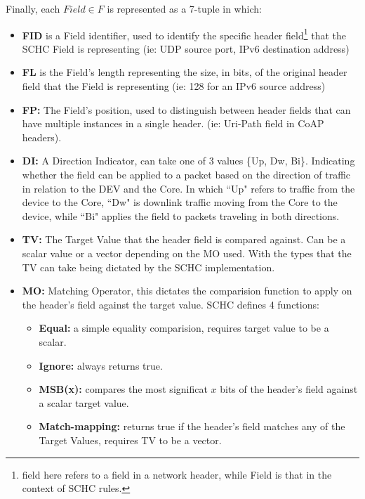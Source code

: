 \documentclass[cspaper]{IEEEtran}
\numberwithin{equation}{subsection}
\begin{document}
	Finally, each $Field \in F$ is represented as a 7-tuple in which:
	\begin{itemize}
		\item \textbf{FID} is a Field identifier, used to identify the specific header field\footnote{field here refers to a field in 
			a network header, while Field is that in the context of SCHC rules.} that the SCHC Field is representing (ie: UDP source port, IPv6 destination address)


		\item \textbf{FL}
			is the Field's length representing the size, in bits, of the original header field that the Field is representing (ie: 128 for an IPv6 source address)
		\item \textbf{FP:} 
			The Field's position, used to distinguish between header fields that can have multiple instances in a single header. (ie: Uri-Path field in CoAP headers). 

		\item \textbf{DI:} 
			 A Direction Indicator, can take one of 3 values \{Up, Dw, Bi\}. Indicating whether the field can be applied to a packet based on the direction of traffic
			in relation to the DEV and the Core. In which ``Up" refers to traffic from the device to the Core, ``Dw" is downlink traffic moving from
			the Core to the device, while ``Bi" applies the field to packets traveling in both directions.

	\item \textbf{TV:}
			The Target Value that the header field is compared against. Can be a scalar value or a vector depending on the MO used. With the types that the 
			TV can take being dictated by the SCHC implementation.

	\item \textbf{MO:}
			Matching Operator, this dictates the comparision function to apply on the header's field against the target value. SCHC defines 4 functions:
			\begin{adjustwidth}{1em}{0em}
			\begin{itemize}
				\item  \textbf{Equal:} 
						a simple equality comparision, requires target value to be a scalar.
					\item \textbf{Ignore:}
						always returns true.
					\item \textbf{MSB(x):} 
						compares the most significat $x$ bits of the header's field against a scalar target value.
					\item \textbf{Match-mapping:}
					returns true if the header's field matches any of the Target Values, requires TV to be a vector.
			\end{itemize}	
			\end{adjustwidth}	
			


\end{itemize}
\end{document}
